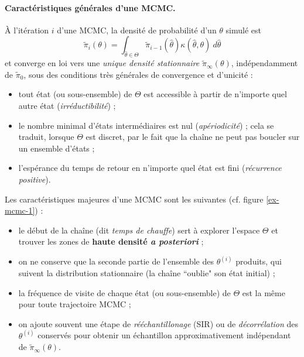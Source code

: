 \paragraph{Caractéristiques générales d'une MCMC.}
\`A l'itération $i$ d'une MCMC, la densité de probabilité d'un $\theta$ simulé est
$$
\tilde{\pi}_i(\theta)  =  \int_{\hat{\theta}\in\Theta} \tilde{\pi}_{i-1}(\hat{\theta}) {\kappa}(\hat{\theta},\theta) \ d\hat{\theta}
$$
et converge en loi vers une \emph{unique densité stationnaire $\tilde{\pi}_{\infty}(\theta)$}, indépendamment de $\tilde{\pi}_0$, sous des conditions très générales de convergence et d'unicité :
\begin{itemize}
\item tout état (ou sous-ensemble) de $\Theta$ est accessible à partir de n'importe quel autre état  ({\it irréductibilité}) ;
\item le nombre minimal d'états intermédiaires est nul  ({\it apériodicité}) ; cela se traduit, lorsque $\Theta$ est discret, par le fait que la chaîne ne peut pas boucler sur un ensemble d'états ; 
\item l'espérance du temps de retour en n'importe quel état est fini ({\it récurrence positive}).
\end{itemize}
Les caractéristiques majeures d'une MCMC sont les suivantes (cf. figure \ref{ex-mcmc-1}) :
\begin{itemize}
\item le début de la chaîne (dit \emph{\it temps de chauffe}) sert à explorer l'espace $\Theta$ et trouver les zones de {\bf haute densité {\it a posteriori}} ;
\item on ne conserve que la seconde partie de l'ensemble des $\theta^{(i)}$ produits, qui suivent la distribution stationnaire (la chaîne ``oublie" son état initial) ; 
\item la fréquence de visite de chaque état (ou sous-ensemble) de $\Theta$ est la même pour toute trajectoire MCMC ; 
\item on ajoute souvent une étape de \emph{rééchantillonage} (SIR) ou de \emph{décorrélation} des $\theta^{(i)}$ conservés pour obtenir
un échantillon approximativement indépendant de $\tilde{\pi}_{\infty}(\theta)$.  \\
\end{itemize} 





